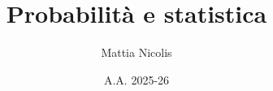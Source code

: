 \documentclass[a4paper, 12pt]{book}
\title{\textbf{Probabilità e statistica}}
\author{Mattia Nicolis}
\date{A.A. 2025-26}
\begin{document}
    \maketitle

    \tableofcontents
    \markboth{}{}
\end{document}
